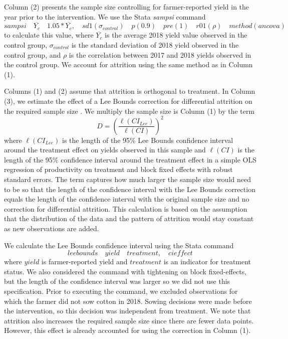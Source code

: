 \documentclass{article}
\begin{document}
Column (2) presents the sample size controlling for farmer-reported yield in the year prior to the intervention. We use the Stata \textit{sampsi} command 
$$ 
sampsi \quad \overline{Y_c} \quad 1.05*\overline{Y_c}, \quad sd1(\sigma_{control}) \quad p(0.9) \quad pre(1) \quad r01(\rho) \quad method(ancova) 
$$
to calculate this value, where $\overline{Y_c}$ is the average 2018 yield value observed in the control group, $\sigma_{control}$ is the standard deviation of 2018 yield observed in the control group, and $\rho$ is the correlation between 2017 and 2018 yields observed in the control group. We account for attrition using the same method as in Column (1).

Columns (1) and (2) assume that attrition is orthogonal to treatment. In Column (3), we estimate the effect of a Lee Bounds correction for differential attrition on the required sample size \citep{Lee2009TrainingEffects}. We multiply the sample size is Column (1) by the term 
$$
D = \left( \dfrac{\ell(CI_{Lee})}{\ell(CI)} \right)^2
$$
where $\ell(CI_{Lee})$ is the length of the 95\% Lee Bounds confidence interval around the treatment effect on yields observed in this sample and $\ell(CI)$ is the length of the 95\% confidence interval around the treatment effect in a simple OLS regression of productivity on treatment and block fixed effects with robust standard errors. The term captures how much larger the sample size would need to be so that the length of the confidence interval with the Lee Bounds correction equals the length of the confidence interval with the original sample size and no correction for differential attrition. This calculation is based on the assumption that the distribution of the data and the pattern of attrition would stay constant as new observations are added. 

We calculate the Lee Bounds confidence interval using the Stata command 
$$ 
leebounds \quad yield \quad treatment, \quad cieffect
$$
where $yield$ is farmer-reported yield and $treatment$ is an indicator for treatment status. We also considered the command with tightening on block fixed-effects, but the length of the confidence interval was larger so we did not use this specification. Prior to executing the command, we excluded observations for which the farmer did not sow cotton in 2018. Sowing decisions were made before the intervention, so this decision was independent from treatment. We note that attrition also increases the required sample size since there are fewer data points. However, this effect is already accounted for using the correction in Column (1). 
\end{document}
